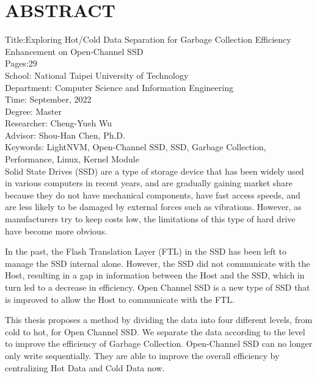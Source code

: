 \chapter*{ABSTRACT}


\noindent
Title:Exploring Hot/Cold Data Separation for Garbage Collection Efficiency Enhancement on Open-Channel SSD\\
Pages:29\\
School: National Taipei University of Technology\\
Department: Computer Science and Information Engineering\\
Time: September, 2022\\
Degree: Master\\
Researcher: Cheng-Yueh Wu\\
Advisor: Shou-Han Chen, Ph.D.\\
Keywords: LightNVM, Open-Channel SSD, SSD, Garbage Collection, Performance, Linux, Kernel Module\\

Solid State Drives (SSD) are a type of storage device that has been widely used in various computers in recent years, and are gradually gaining market share because they do not have mechanical components, have fast access speeds, and are less likely to be damaged by external forces such as vibrations. However, as manufacturers try to keep costs low, the limitations of this type of hard drive have become more obvious.

\indent
In the past, the Flash Translation Layer (FTL) in the SSD has been left to manage the SSD internal alone. However, the SSD did not communicate with the Host, resulting in a gap in information between the Host and the SSD, which in turn led to a decrease in efficiency. Open Channel SSD is a new type of SSD that is improved to allow the Host to communicate with the FTL.

\indent
This thesis proposes a method by dividing the data into four different levels, from cold to hot, for Open Channel SSD. We separate the data according to the level to improve the efficiency of Garbage Collection. Open-Channel SSD can no longer only write sequentially. They are able to improve the overall efficiency by centralizing Hot Data and Cold Data now.

